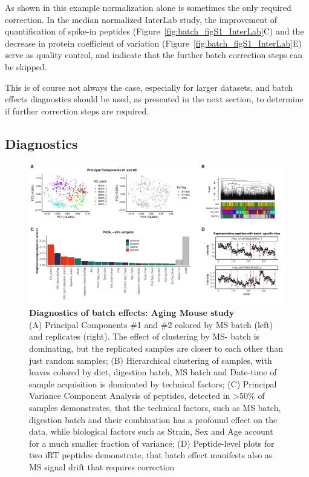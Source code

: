\documentclass[num-refs]{wiley-article}
\begin{document}
As shown in this example normalization alone is sometimes the only required correction. In the median normalized InterLab study, the improvement of quantification of spike-in peptides (Figure~\ref{fig:batch_figS1_InterLab}C) and the decrease in protein coefficient of variation (Figure~\ref{fig:batch_figS1_InterLab}E) serve as quality control, and indicate that the further batch correction steps can be skipped.

This is of course not always the case, especially for larger datasets, and batch effects diagnostics should be used, as presented in the next section, to determine if further correction steps are required.


\subsection{Diagnostics}

\begin{figure}[hbt]
	\includegraphics[width=\textwidth]{figures/Fig3_diagnostics.pdf}
	\caption{\textbf{Diagnostics of batch effects: Aging Mouse study}  \\
		\footnotesize
		(A) Principal Components \#1 and \#2 colored by MS batch (left) and replicates (right). The effect of clustering by MS- batch is dominating, but the replicated samples are closer to each other than just random samples; (B) Hierarchical clustering of samples, with leaves colored by diet, digestion batch, MS batch and Date-time of sample acquisition is dominated by technical factors; (C) Principal Variance Component Analysis of peptides, detected in >50\% of samples demonstrates, that the technical factors, such as MS batch, digestion batch and their combination has a profound effect on the data, while biological factors such as Strain, Sex and Age account for a much smaller fraction of variance; (D) Peptide-level plots for two iRT peptides demonstrate, that batch effect manifests also as MS signal drift that requires correction}
	\label{fig:batch_fig3_diagnostics}
\end{figure}
\end{document}
